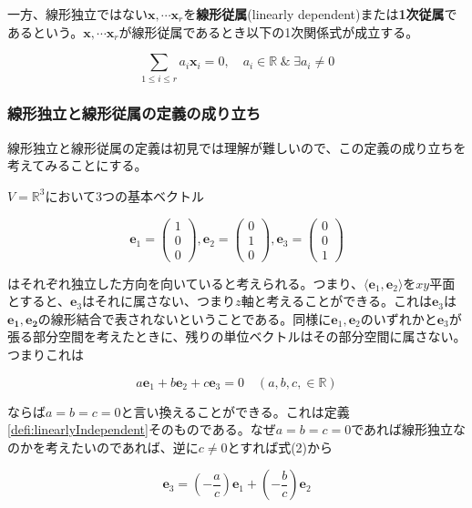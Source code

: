 \documentclass[dvipdfmx,autodetect-engine]{jsarticle}
\newcommand{\vecSpace}[1]{\mathbb{R}^{#1}}
\begin{document}
一方、線形独立ではない$\bm{x}, \cdots \bm{x}_r$を{\bf 線形従属}(linearly dependent)または{\bf 1次従属}であるという。$\bm{x}, \cdots \bm{x}_r$が線形従属であるとき以下の1次関係式が成立する。

$$
\sum_{1 \leq i \leq r} a_i\bm{x}_i = 0, \quad a_i \in \mathbb{R} \hspace{3pt} \& \hspace{3pt} \exists a_i \neq 0
$$

\subsubsection{線形独立と線形従属の定義の成り立ち}

線形独立と線形従属の定義は初見では理解が難しいので、この定義の成り立ちを考えてみることにする。

$V = \vecSpace{3}$において3つの基本ベクトル

$$
\bm{e}_1 = \begin{pmatrix}
1 \\
0 \\
0
\end{pmatrix}, 
\bm{e}_2 = \begin{pmatrix}
0 \\
1 \\
0
\end{pmatrix}, 
\bm{e}_3 = \begin{pmatrix}
0 \\
0 \\
1
\end{pmatrix}
$$

はそれぞれ独立した方向を向いていると考えられる。つまり、$\langle \bm{e}_1, \bm{e}_2 \rangle$を$xy$平面とすると、$\bm{e}_3$はそれに属さない、つまり$z$軸と考えることができる。これは$\bm{e}_3$は$\bm{e_1}, \bm{e_2}$の線形結合で表されないということである。同様に$\bm{e}_1, \bm{e}_2$のいずれかと$\bm{e}_3$が張る部分空間を考えたときに、残りの単位ベクトルはその部分空間に属さない。つまりこれは

\begin{equation}
    a\bm{e}_1 + b\bm{e}_2 + c\bm{e}_3 = 0 \quad (a, b, c, \in \mathbb{R}) 
\end{equation}

ならば$a = b = c = 0$と言い換えることができる。これは定義\ref{defi:linearlyIndependent}そのものである。なぜ$a = b = c = 0$であれば線形独立なのかを考えたいのであれば、逆に$c \neq 0$とすれば式(2)から

$$
\bm{e}_3 = \left(-\frac{a}{c}\right)\bm{e}_1 + \left(-\frac{b}{c}\right)\bm{e}_2
$$
\end{document}
